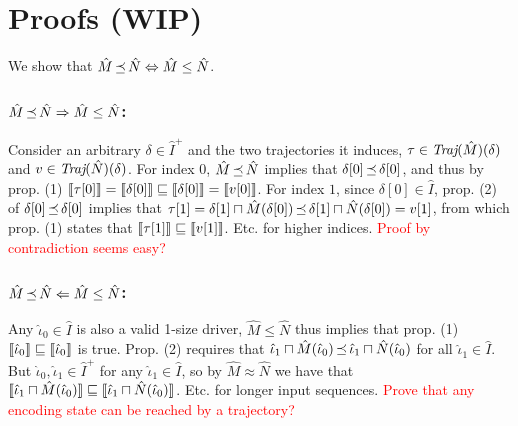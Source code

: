 \section{Proofs (WIP)}

We show that $\hat M \operatorname{\preceq} \hat N \Leftrightarrow \hat M \leq \hat N$.

\subsubsection{$\hat M \operatorname{\preceq} \hat N \Rightarrow \hat M \leq \hat N$:}

Consider an arbitrary $\delta \in \hat I^{+}$ and the two trajectories it induces, $\tau \in \operatorname{\textit{Traj}}(\hat M)(\delta)$ and $v \in \operatorname{\textit{Traj}}(\hat N)(\delta)$. For index $0$, $\hat M \operatorname{\preceq} \hat N$ implies that $\delta[0] \operatorname{\preceq} \delta[0]$, and thus by prop. (1) $\llbracket\tau[0]\rrbracket = \llbracket\delta[0]\rrbracket \sqsubseteq \llbracket\delta[0]\rrbracket = \llbracket v[0]\rrbracket$. For index $1$, since $\delta[0] \in \hat I$, prop. (2) of $\delta[0] \operatorname{\preceq} \delta[0]$ implies that $\tau[1] = \delta[1] \sqcap \hat M(\delta[0]) \operatorname{\preceq} \delta[1] \sqcap \hat N(\delta[0]) = v[1]$, from which prop. (1) states that $\llbracket\tau[1]\rrbracket \sqsubseteq \llbracket v[1]\rrbracket$. Etc. for higher indices. \textcolor{red}{Proof by contradiction seems easy?}

\subsubsection{$\hat M \operatorname{\preceq} \hat N \Leftarrow \hat M \leq \hat N$:}

Any $\hat \iota_{0} \in \hat I$ is also a valid 1-size driver, $\hat M \leq \hat N$ thus implies that prop. (1) $\llbracket\hat \iota_{0}\rrbracket \sqsubseteq \llbracket\hat \iota_{0}\rrbracket$ is true. Prop. (2) requires that $\hat \iota_{1} \sqcap \hat M(\hat \iota_{0}) \operatorname{\preceq} \hat \iota_{1} \sqcap \hat N(\hat \iota_{0})$ for all $\hat \iota_{1} \in \hat I$. But $\hat \iota_{0}, \hat \iota_{1} \in \hat I^{+}$ for any $\hat \iota_{1} \in \hat I$, so by $\hat M \approx \hat N$ we have that $\llbracket\hat \iota_{1} \sqcap \hat M(\hat \iota_{0})\rrbracket \sqsubseteq \llbracket\hat \iota_{1} \sqcap \hat N(\hat \iota_{0})\rrbracket$. Etc. for longer input sequences. \textcolor{red}{Prove that any encoding state can be reached by a trajectory?}
